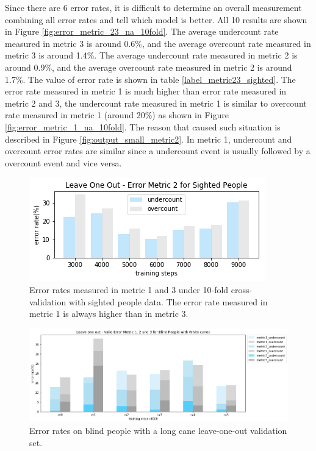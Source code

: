 \documentclass[11pt]{article}
\begin{document}
Since there are 6 error rates, it is difficult to determine an overall measurement combining all error rates and tell which model is better. All 10 results are shown in Figure \ref{fig:error_metric_23_na_10fold}.
The average undercount rate measured in metric 3 is around 0.6\%, and the average overcount rate measured in metric 3 is around 1.4\%.  
The average undercount rate measured in metric 2 is around 0.9\%, and the average overcount rate measured in metric 2 is around 1.7\%.  
The value of error rate is shown in table \ref{label_metric23_sighted}. The error rate measured in metric 1 is much higher than error rate measured in metric 2 and 3, the undercount rate measured in metric 1 is similar to overcount rate measured in metric 1 (around 20\%) as shown in Figure \ref{fig:error_metric_1_na_10fold}. The reason that caused such situation is described in Figure \ref{fig:output_small_metric2}. In metric 1, undercount and overcount error rates are similar since a undercount event is usually followed by a overcount event and vice versa.

\begin{figure}[ht]
\centering
\includegraphics[scale=0.55]{error_metric_2_na_step}
\caption{Error rates measured in metric 1 and 3 under 10-fold cross-validation with sighted people data. The error rate measured in metric 1 is always higher than in metric 3.}
\label{fig:error_metric_2_na_step}
\end{figure}


\begin{figure}[ht]
\centering
\includegraphics[scale=0.5]{error_metric_wc_10fold_valid4000}
\caption{Error rates on blind people with a long cane leave-one-out validation set.}
\label{fig:error_metric_wc_10fold_valid4000}
\end{figure}
\end{document}

